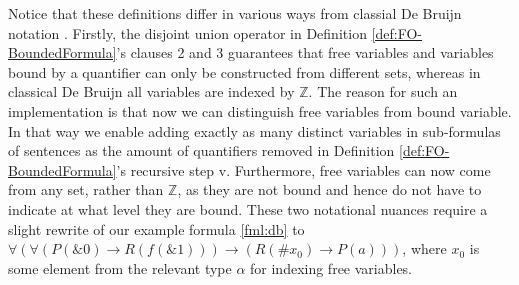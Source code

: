 Notice that these definitions differ in various ways from classial De Bruijn notation \cite{bruijn:1972}. Firstly, the disjoint union operator in Definition \ref{def:FO-BoundedFormula}'s clauses 2 and 3 guarantees that free variables and variables bound by a quantifier can only be constructed from different sets, whereas in classical De Bruijn all variables are indexed by $\mathbb{Z}$. The reason for such an implementation is that now we can distinguish free variables from bound variable. In that way we enable adding exactly as many distinct variables in sub-formulas of sentences as the amount of quantifiers removed in Definition \ref{def:FO-BoundedFormula}'s recursive step v. Furthermore, free variables can now come from any set, rather than $\mathbb{Z}$, as they are not bound and hence do not have to indicate at what level they are bound. These two notational nuances require a slight rewrite of our example formula \ref{fml:db} to $\forall (\forall(P(\&0) \rightarrow R(f(\&1))) \to (R(\#x_0) \to P(a)))$, where $x_0$ is some element from the relevant type $\alpha$ for indexing free variables.

